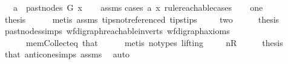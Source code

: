 \begin{isabellebody}
\ \ {\isacharbar}{\kern0pt}\ {\isachardoublequoteopen}a\ {\isasymin}\ past{\isacharunderscore}{\kern0pt}nodes\ G\ x{\isachardoublequoteclose}\isanewline
%
\isadelimproof
\ \ %
\endisadelimproof
%
\isatagproof
{}\isamarkupfalse%
\ assms\isanewline
{}\isamarkupfalse%
{\isacharparenleft}{\kern0pt}cases\ a\ x\ rule{\isacharcolon}{\kern0pt}reachable{}{\isacharunderscore}{\kern0pt}cases{\isacharparenright}{\kern0pt}\isanewline
\ \ \isamarkupfalse%
\ one\isanewline
\ \ \isamarkupfalse%
\ \isamarkupfalse%
\ {\isacharquery}{\kern0pt}thesis\isanewline
\ \ \ \ \isamarkupfalse%
\ {\isacharparenleft}{\kern0pt}metis\ assms{\isacharparenleft}{\kern0pt}{}{\isacharparenright}{\kern0pt}\ tips{\isacharunderscore}{\kern0pt}not{\isacharunderscore}{\kern0pt}referenced\ tips{\isacharunderscore}{\kern0pt}tips{\isacharparenright}{\kern0pt}\ \isanewline
{}\isamarkupfalse%
\isanewline
\ \ \isamarkupfalse%
\ two\isanewline
\ \ \isamarkupfalse%
\ \isamarkupfalse%
\ {\isacharquery}{\kern0pt}thesis\ \isamarkupfalse%
\ past{\isacharunderscore}{\kern0pt}nodes{\isachardot}{\kern0pt}simps\ wf{\isacharunderscore}{\kern0pt}digraph{\isachardot}{\kern0pt}reachable{}{\isacharunderscore}{\kern0pt}in{\isacharunderscore}{\kern0pt}verts{\isacharparenleft}{\kern0pt}{}{\isacharparenright}{\kern0pt}\ wf{\isacharunderscore}{\kern0pt}digraph{\isacharunderscore}{\kern0pt}axioms\isanewline
\ \ \ \ \ \ mem{\isacharunderscore}{\kern0pt}Collect{\isacharunderscore}{\kern0pt}eq\ that{\isacharparenleft}{\kern0pt}{}{\isacharparenright}{\kern0pt}\isanewline
\ \ \ \ \isamarkupfalse%
\ {\isacharparenleft}{\kern0pt}metis\ {\isacharparenleft}{\kern0pt}no{\isacharunderscore}{\kern0pt}types{\isacharcomma}{\kern0pt}\ lifting{\isacharparenright}{\kern0pt}{\isacharparenright}{\kern0pt}\ \isanewline
{}\isamarkupfalse%
\isanewline
\ \ \isamarkupfalse%
\ nR\isanewline
\ \ \isamarkupfalse%
\ \isamarkupfalse%
\ {\isacharquery}{\kern0pt}thesis\ \isamarkupfalse%
\ that{\isacharparenleft}{\kern0pt}{}{\isacharparenright}{\kern0pt}\ anticone{\isachardot}{\kern0pt}simps\ assms\ \isamarkupfalse%
\ auto\isanewline
{}\isamarkupfalse%
%
\endisatagproof
{\isafoldproof}%
%
\isadelimproof
\ \isanewline
%
\endisadelimproof
\isanewline
{}\isamarkupfalse%

\end{isabellebody}
